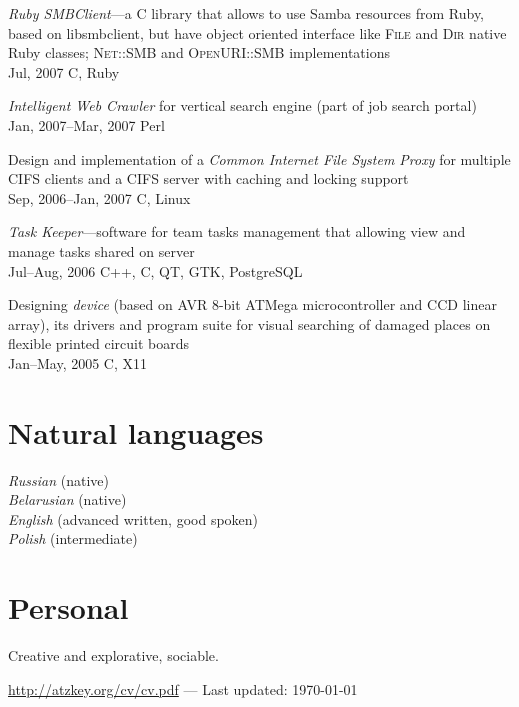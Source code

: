 \documentclass[12pt, a4paper]{article}
\newcommand{\years}[2]{\marginpar{\scriptsize #1 #2}}
\begin{document}
\begin{list}{}{\leftmargin=0pt}
		\item \textit{Ruby SMBClient}---a C library that allows to use Samba resources from Ruby, based on
		libsmbclient, but have object oriented interface like \textsc{File} and \textsc{Dir} native Ruby classes;
		\textsc{Net::SMB} and \textsc{OpenURI::SMB} implementations\\
		Jul, 2007 \hfill C, Ruby

		\item \textit{Intelligent Web Crawler} for vertical search engine (part of job search
		portal)\\
		Jan, 2007--Mar, 2007 \hfill Perl

		\item Design and implementation of a \textit{Common Internet File System Proxy}
		for multiple CIFS clients and a CIFS server with caching and locking
		support\\
		Sep, 2006--Jan, 2007 \hfill C, Linux

		\item \textit{Task Keeper}---software for team tasks management that allowing view and
		manage tasks shared on server\\
		Jul--Aug, 2006 \hfill C++, C, QT, GTK, PostgreSQL

		\item Designing \textit{device} \years{2005}{University project} (based on AVR 8-bit ATMega microcontroller and CCD
		linear array), its drivers and program suite for visual searching of damaged
		places on flexible printed circuit boards\\
		Jan--May, 2005 \hfill C, X11
	\end{list}

	\section*{Natural languages}
	\textit{Russian} (native)\\
	\textit{Belarusian} (native)\\
	\textit{English} (advanced written, good spoken)\\
	\textit{Polish} (intermediate)

	\section*{Personal}
	Creative and explorative, sociable.

	\vfill{}
	\hrulefill
	\begin{center}
		\footnotesize \href{http://atzkey.org/cv/cv.pdf}{http://atzkey.org/cv/cv.pdf} — Last updated: \today
	\end{center}
\end{document}
